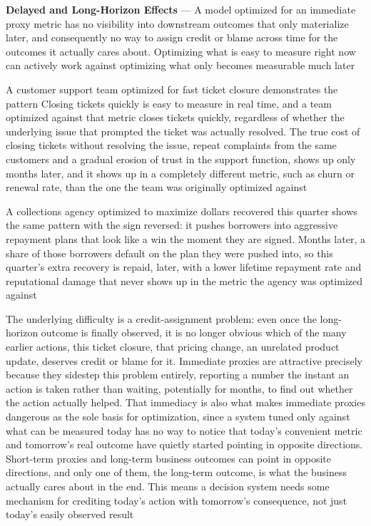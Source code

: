 \textbf{Delayed and Long-Horizon Effects} --- A model optimized for an immediate
proxy metric has no visibility into downstream outcomes that only materialize
later, and consequently no way to assign credit or blame across time for the outcomes
it actually cares about. Optimizing what is easy to measure right now can
actively work against optimizing what only becomes measurable much later

A customer support team optimized for fast ticket closure demonstrates the pattern
Closing tickets quickly is easy to measure in real time, and a team optimized
against that metric closes tickets quickly, regardless of whether the underlying
issue that prompted the ticket was actually resolved. The true cost of closing
tickets without resolving the issue, repeat complaints from the same customers and
a gradual erosion of trust in the support function, shows up only months later, and
it shows up in a completely different metric, such as churn or renewal rate, than
the one the team was originally optimized against

A collections agency optimized to maximize dollars recovered this quarter shows the
same pattern with the sign reversed: it pushes borrowers into aggressive repayment
plans that look like a win the moment they are signed. Months later, a share of
those borrowers default on the plan they were pushed into, so this quarter's extra
recovery is repaid, later, with a lower lifetime repayment rate and reputational
damage that never shows up in the metric the agency was optimized against

The underlying difficulty is a credit-assignment problem: even once the long-horizon
outcome is finally observed, it is no longer obvious which of the many earlier
actions, this ticket closure, that pricing change, an unrelated product update,
deserves credit or blame for it. Immediate proxies are attractive precisely because
they sidestep this problem entirely, reporting a number the instant an action is
taken rather than waiting, potentially for months, to find out whether the
action actually helped. That immediacy is also what makes immediate proxies dangerous
as the sole basis for optimization, since a system tuned only against what can
be measured today has no way to notice that today's convenient metric and
tomorrow's real outcome have quietly started pointing in opposite directions. Short-term
proxies and long-term business outcomes can point in opposite directions, and
only one of them, the long-term outcome, is what the business actually cares
about in the end. This means a decision system needs some mechanism for crediting
today's action with tomorrow's consequence, not just today's easily observed
result

